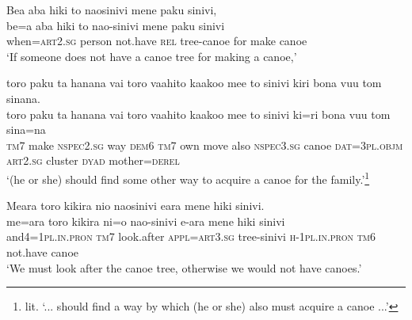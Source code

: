 \ea\label{ex:text3-14}
Bea aba hiki to naosinivi mene paku sinivi,\\
\gll be=a	aba	hiki	to	nao-sinivi	mene	paku	sinivi\\
     when=\textsc{art}2.\textsc{sg}	person	not.have	\textsc{rel}	tree-canoe	for	make	canoe\\
\glt `If someone does not have a canoe tree for making a canoe,'
\z

\ea\label{ex:text3-15}
toro paku ta hanana vai toro vaahito kaakoo mee to sinivi kiri bona vuu tom sinana.\\
\gll toro	paku	ta	hanana	vai	toro	vaahito	kaakoo	mee	to	sinivi	ki=ri	bona	vuu	tom	sina=na\\
     \textsc{tm}7	make	\textsc{nspec}2.\textsc{sg}	way	\textsc{dem}6	\textsc{tm}7	own	move	also	\textsc{nspec}3.\textsc{sg}	canoe	\textsc{dat}=3\textsc{pl}.\textsc{objm}	\textsc{art}2.\textsc{sg}	cluster	\textsc{dyad}	mother=\textsc{derel}\\
\glt `(he or she) should find some other way to acquire a canoe for the family.'\footnote{lit. `... should find a way by which (he or she) also must acquire a canoe ...'}
\z

\ea\label{ex:text3-16}
Meara toro kikira nio naosinivi eara mene hiki sinivi.\\
\gll me=ara	toro	kikira	ni=o	nao-sinivi	e-ara	mene	hiki	sinivi\\
     and4=1\textsc{pl}.\textsc{in}.\textsc{pron}	\textsc{tm}7	look.after	\textsc{appl}=\textsc{art}3.\textsc{sg}	tree-sinivi	\textsc{h}-1\textsc{pl}.\textsc{in}.\textsc{pron}	\textsc{tm}6	not.have	canoe\\
\glt `We must look after the canoe tree, otherwise we would not have canoes.'
\z
